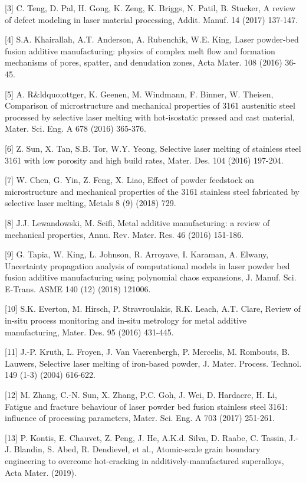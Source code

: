 \documentclass[10pt]{article}
\begin{document}
[3] C. Teng, D. Pal, H. Gong, K. Zeng, K. Briggs, N. Patil, B. Stucker, A review of defect modeling in laser material processing, Addit. Manuf. 14 (2017) 137-147.

[4] S.A. Khairallah, A.T. Anderson, A. Rubenchik, W.E. King, Laser powder-bed fusion additive manufacturing: physics of complex melt flow and formation mechanisms of pores, spatter, and denudation zones, Acta Mater. 108 (2016) 36-45.

[5] A. R\&ldquo;ottger, K. Geenen, M. Windmann, F. Binner, W. Theisen, Comparison of microstructure and mechanical properties of 3161 austenitic steel processed by selective laser melting with hot-isostatic pressed and cast material, Mater. Sci. Eng. A 678 (2016) 365-376.

[6] Z. Sun, X. Tan, S.B. Tor, W.Y. Yeong, Selective laser melting of stainless steel 3161 with low porosity and high build rates, Mater. Des. 104 (2016) 197-204.

[7] W. Chen, G. Yin, Z. Feng, X. Liao, Effect of powder feedstock on microstructure and mechanical properties of the 3161 stainless steel fabricated by selective laser melting, Metals 8 (9) (2018) 729.

[8] J.J. Lewandowski, M. Seifi, Metal additive manufacturing: a review of mechanical properties, Annu. Rev. Mater. Res. 46 (2016) 151-186.

[9] G. Tapia, W. King, L. Johnson, R. Arroyave, I. Karaman, A. Elwany, Uncertainty propagation analysis of computational models in laser powder bed fusion additive manufacturing using polynomial chaos expansions, J. Manuf. Sci. E-Trans. ASME 140 (12) (2018) 121006.

[10] S.K. Everton, M. Hirsch, P. Stravroulakis, R.K. Leach, A.T. Clare, Review of in-situ process monitoring and in-situ metrology for metal additive manufacturing, Mater. Des. 95 (2016) 431-445.

[11] J.-P. Kruth, L. Froyen, J. Van Vaerenbergh, P. Mercelis, M. Rombouts, B. Lauwers, Selective laser melting of iron-based powder, J. Mater. Process. Technol. 149 (1-3) (2004) 616-622.

[12] M. Zhang, C.-N. Sun, X. Zhang, P.C. Goh, J. Wei, D. Hardacre, H. Li, Fatigue and fracture behaviour of laser powder bed fusion stainless steel 3161: influence of processing parameters, Mater. Sci. Eng. A 703 (2017) 251-261.

[13] P. Kontis, E. Chauvet, Z. Peng, J. He, A.K.d. Silva, D. Raabe, C. Tassin, J.-J. Blandin, S. Abed, R. Dendievel, et al., Atomic-scale grain boundary engineering to overcome hot-cracking in additively-manufactured superalloys, Acta Mater. (2019).
\end{document}
